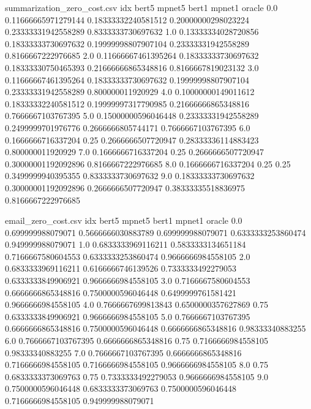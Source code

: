 \begin{filecontents*}{summarization_zero_cost.csv}
idx	bert5	mpnet5	bert1	mpnet1	oracle
0.0	0.11666665971279144	0.18333332240581512	0.20000000298023224	0.23333331942558289	0.8333333730697632
1.0	0.13333334028720856	0.18333333730697632	0.19999998807907104	0.23333331942558289	0.8166667222976685
2.0	0.11666667461395264	0.18333333730697632	0.18333330750465393	0.21666666865348816	0.8166667819023132
3.0	0.11666667461395264	0.18333333730697632	0.19999998807907104	0.23333331942558289	0.800000011920929
4.0	0.10000000149011612	0.18333332240581512	0.19999997317790985	0.21666666865348816	0.7666667103767395
5.0	0.15000000596046448	0.23333331942558289	0.2499999701976776	0.2666666805744171	0.7666667103767395
6.0	0.1666666716337204	0.25	0.2666666507720947	0.28333336114883423	0.800000011920929
7.0	0.1666666716337204	0.25	0.2666666507720947	0.30000001192092896	0.8166667222976685
8.0	0.1666666716337204	0.25	0.25	0.3499999940395355	0.8333333730697632
9.0	0.18333333730697632	0.30000001192092896	0.2666666507720947	0.38333335518836975	0.8166667222976685

\end{filecontents*}
\begin{filecontents*}{email_zero_cost.csv}
idx	bert5	mpnet5	bert1	mpnet1	oracle
0.0	0.699999988079071	0.5666666030883789	0.699999988079071	0.6333333253860474	0.949999988079071
1.0	0.6833333969116211	0.5833333134651184	0.7166667580604553	0.6333333253860474	0.9666666984558105
2.0	0.6833333969116211	0.6166666746139526	0.7333333492279053	0.6333333849906921	0.9666666984558105
3.0	0.7166667580604553	0.6666666865348816	0.7500000596046448	0.6499999761581421	0.9666666984558105
4.0	0.7666667699813843	0.6500000357627869	0.75	0.6333333849906921	0.9666666984558105
5.0	0.7666667103767395	0.6666666865348816	0.7500000596046448	0.6666666865348816	0.98333340883255
6.0	0.7666667103767395	0.6666666865348816	0.75	0.7166666984558105	0.98333340883255
7.0	0.7666667103767395	0.6666666865348816	0.7166666984558105	0.7166666984558105	0.9666666984558105
8.0	0.75	0.6833333373069763	0.75	0.7333333492279053	0.9666666984558105
9.0	0.7500000596046448	0.6833333373069763	0.7500000596046448	0.7166666984558105	0.949999988079071
\end{filecontents*}




